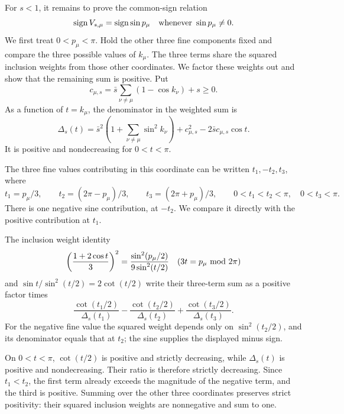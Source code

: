 \documentclass[11pt,a4paper]{article}
\theoremstyle{remark}
\begin{document}
For $s<1$, it remains to prove the common-sign relation
\begin{equation}
 \operatorname{sign}V_{s,\mu}
       =\operatorname{sign}\sin p_\mu
       \quad\hbox{whenever }\sin p_\mu\ne0 .
\end{equation}
We first treat $0<p_\mu<\pi$. Hold the other three fine
components fixed and compare the three possible values of $k_\mu$.
The three terms share the squared inclusion weights from those
other coordinates. We factor these weights out and show that the
remaining sum is positive. Put
\begin{equation}
 c_{\mu,s}=\bar s\sum_{\nu\ne\mu}(1-\cos k_\nu)+s\ge0 .
\end{equation}
As a function of $t=k_\mu$, the denominator in the weighted sum is
\begin{equation}
 \Delta_s(t)=\bar s^2\left(1+\sum_{\nu\ne\mu}\sin^2 k_\nu\right)
                    +c_{\mu,s}^2-2\bar s c_{\mu,s}\cos t .
\end{equation}
It is positive and nondecreasing for $0<t<\pi$.

The three fine values contributing in this coordinate can be written
$t_1,-t_2,t_3$, where
\begin{equation}
 t_1=p_\mu/3,\qquad t_2=(2\pi-p_\mu)/3,\qquad
 t_3=(2\pi+p_\mu)/3,\qquad
 0<t_1<t_2<\pi,\quad 0<t_3<\pi .
\end{equation}
There is one negative sine contribution, at $-t_2$. We compare it
directly with the positive contribution at $t_1$.

The inclusion weight identity
\begin{equation}
 \left(\frac{1+2\cos t}{3}\right)^2
       =\frac{\sin^2(p_\mu/2)}{9\sin^2(t/2)}
       \quad (3t=p_\mu\ {\rm mod}\ 2\pi)
\end{equation}
and $\sin t/\sin^2(t/2)=2\cot(t/2)$ write their three-term sum
as a positive factor times
\begin{equation}
 \frac{\cot(t_1/2)}{\Delta_s(t_1)}
 -\frac{\cot(t_2/2)}{\Delta_s(t_2)}
 +\frac{\cot(t_3/2)}{\Delta_s(t_3)}.
\end{equation}
For the negative fine value the squared weight depends only on
$\sin^2(t_2/2)$, and its denominator equals that at $t_2$;
the sine supplies the displayed minus sign.

On $0<t<\pi$,
$\cot(t/2)$ is positive and strictly decreasing, while
$\Delta_s(t)$ is positive and nondecreasing. Their ratio is
therefore strictly decreasing. Since $t_1<t_2$, the first term
already exceeds the magnitude of the negative term, and the third is
positive. Summing over the other three coordinates preserves strict
positivity: their squared inclusion weights are nonnegative and sum
to one.
\end{document}
